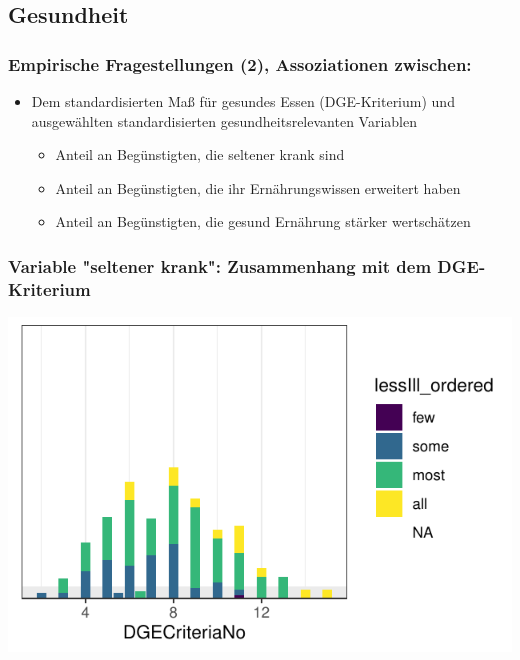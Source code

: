 \subsection{Gesundheit}

\begin{frame}[fragile]
\frametitle{Empirische Fragestellungen (2), Assoziationen zwischen:}
\begin{itemize}
\item Dem standardisierten Maß für gesundes Essen (DGE-Kriterium) und ausgewählten standardisierten gesundheitsrelevanten Variablen
\begin{itemize}
\item Anteil an Begünstigten, die seltener krank sind
\item Anteil an Begünstigten, die ihr Ernährungswissen erweitert haben
\item Anteil an Begünstigten, die gesund Ernährung stärker wertschätzen
\end{itemize}
\end{itemize}
\end{frame}

\begin{frame}[fragile]
\frametitle{Variable "seltener krank": Zusammenhang mit dem DGE-Kriterium}
\begin{knitrout}\footnotesize
{}\color{fgcolor}\begin{kframe}


{\ttfamily\noindent\color{warningcolor}{\#\# Warning: Removed 244 rows containing missing values (position\_stack).}}\end{kframe}

{\centering \includegraphics[width=\maxwidth]{figure/beamer-lessIllDGEplot-1} 

}



\end{knitrout}
\end{frame}

